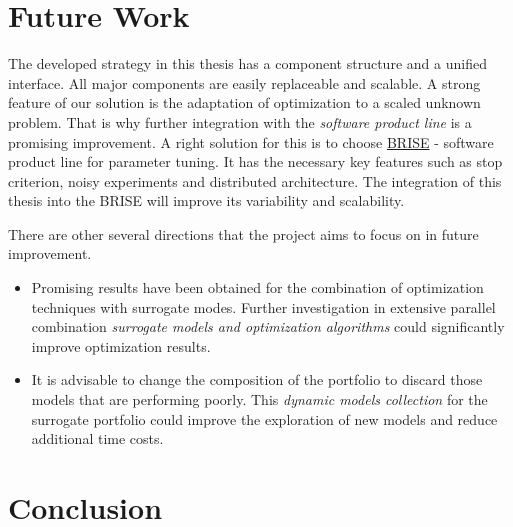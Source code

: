 \chapter{Future Work}\label{sec:future_work}

The developed strategy in this thesis has a component structure and a unified interface. All major components are easily replaceable and scalable. A strong feature of our solution is the adaptation of optimization to a scaled unknown problem. That is why further integration with the \emph{software product line} is a promising improvement. A right solution for this is to choose \hyperref[alg:BRISE]{BRISE} - software product line for parameter tuning. It has the necessary key features such as stop criterion, noisy experiments and distributed architecture. The integration of this thesis into the BRISE will improve its variability and scalability.

There are other several directions that the project aims to focus on in future improvement. 
\begin{itemize}
    \item Promising results have been obtained for the combination of optimization techniques with surrogate modes. Further investigation in extensive parallel combination \emph{surrogate models and optimization algorithms} could significantly improve optimization results.
    \item It is advisable to change the composition of the portfolio to discard those models that are performing poorly. This \emph{dynamic models collection} for the surrogate portfolio could improve the exploration of new models and reduce additional time costs.
\end{itemize}











\chapter{Conclusion}\label{sec:conclusion}

